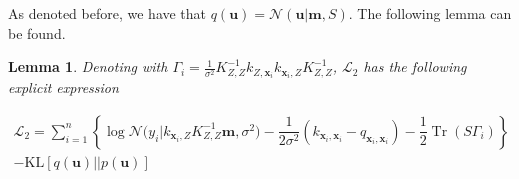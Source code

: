 \documentclass[12pt,a4paper,oneside]{book}
\newtheorem{Lemma}{Lemma}
\DeclareMathOperator{\Tr}{Tr}
\begin{document}
As denoted before, we have that $q(\bm{u}) = \mathcal{N}(\bm{u}|\bm{m},S)$. The following lemma can be found. 

\begin{Lemma}

Denoting with $\Gamma_i = \frac{1}{\sigma^2}K_{Z,Z}^{-1} k_{Z,\bm{x}_i} k_{\bm{x}_i,Z} K_{Z,Z}^{-1}$, $\mathcal{L}_2$ has the following explicit expression

\begin{align}\label{Stochastvargpr}
\mathcal{L}_2 = \sum\limits_{i=1}^{n} \left\{ \log{\mathcal{N}(y_i|k_{\bm{x}_i,Z} K_{Z,Z}^{-1} \bm{m}, \sigma^2}) - \dfrac{1}{2 \sigma^2} (k_{\bm{x}_i,\bm{x}_i} - q_{\bm{x}_i,\bm{x}_i}) - \dfrac{1}{2}\Tr(S\Gamma_i)  \right\} \nonumber \\
- \text{KL}[q(\bm{u})||p(\bm{u})]
\end{align}

\end{Lemma}
\end{document}

